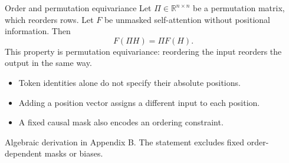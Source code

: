\documentclass[aspectratio=169,11pt]{beamer}
\newcommand{\R}{\mathbb{R}}
\newcommand{\src}[1]{\par\vfill{\fontsize{7}{8.5}\selectfont\color{muted}#1}\par}
\begin{document}
\begin{frame}[t]{Order and permutation equivariance}
Let $\Pi\in\R^{n\times n}$ be a permutation matrix, which reorders rows.
Let $F$ be unmasked self-attention without positional information. Then
\[F(\Pi H)=\Pi F(H).\]
This property is \alert{permutation equivariance}: reordering the input
reorders the output in the same way.
\begin{itemize}
  \item Token identities alone do not specify their absolute positions.
  \item Adding a position vector assigns a different input to each position.
  \item A fixed causal mask also encodes an ordering constraint.
\end{itemize}
\src{Algebraic derivation in Appendix B. The statement excludes fixed order-dependent masks or biases.}
\end{frame}
\end{document}
